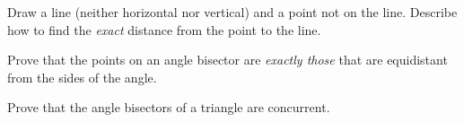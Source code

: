 \begin{prob}
Draw a line (neither horizontal nor vertical) and a point not on the line.  Describe how to find the \emph{exact} distance from the point to the line. 
\end{prob}

\begin{prob}
Prove that the points on an angle bisector are \emph{exactly those} that are equidistant from the sides of the angle. 
\end{prob}

\begin{prob}
Prove that the angle bisectors of a triangle are concurrent. 
\end{prob}

